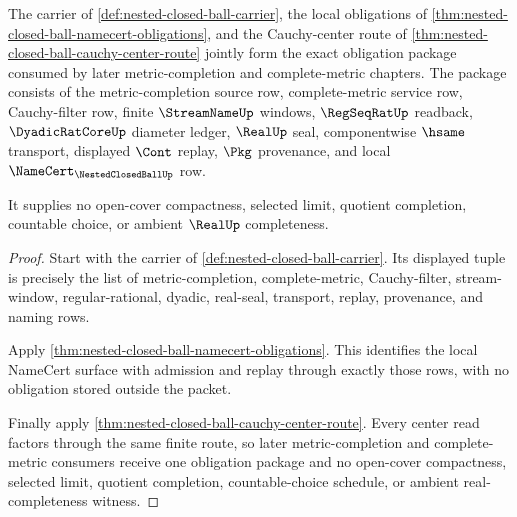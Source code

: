 \begin{theorem}
\label{thm:nested-closed-ball-obligation-package}
The carrier of \autoref{def:nested-closed-ball-carrier}, the local obligations of \autoref{thm:nested-closed-ball-namecert-obligations}, and the Cauchy-center route of \autoref{thm:nested-closed-ball-cauchy-center-route} jointly form the exact obligation package consumed by later metric-completion and complete-metric chapters. The package consists of the metric-completion source row, complete-metric service row, Cauchy-filter row, finite $\StreamNameUp$ windows, $\RegSeqRatUp$ readback, $\DyadicRatCoreUp$ diameter ledger, $\RealUp$ seal, componentwise $\hsame$ transport, displayed $\Cont$ replay, $\Pkg$ provenance, and local $\NameCert_{\NestedClosedBallUp}$ row.

It supplies no open-cover compactness, selected limit, quotient completion, countable choice, or ambient $\RealUp$ completeness.
\end{theorem}
\begin{proof}
Start with the carrier of \autoref{def:nested-closed-ball-carrier}. Its displayed tuple is precisely the list of metric-completion, complete-metric, Cauchy-filter, stream-window, regular-rational, dyadic, real-seal, transport, replay, provenance, and naming rows.

Apply \autoref{thm:nested-closed-ball-namecert-obligations}. This identifies the local NameCert surface with admission and replay through exactly those rows, with no obligation stored outside the packet.

Finally apply \autoref{thm:nested-closed-ball-cauchy-center-route}. Every center read factors through the same finite route, so later metric-completion and complete-metric consumers receive one obligation package and no open-cover compactness, selected limit, quotient completion, countable-choice schedule, or ambient real-completeness witness.
\end{proof}

